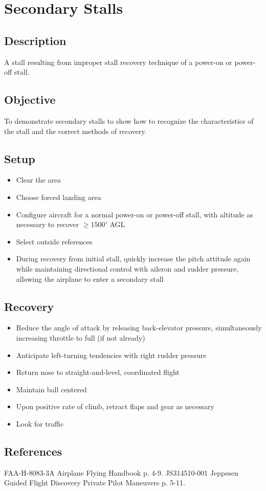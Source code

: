 \section{Secondary Stalls}

\subsection{Description}

A stall resulting from improper stall recovery technique of a power-on or
power-off stall.

\subsection{Objective}

To demonstrate secondary stalls to show how to recognize the characteristics of
the stall and the correct methods of recovery.

\subsection{Setup}

\begin{itemize}
  \item Clear the area
  \item Choose forced landing area
  \item Configure aircraft for a normal power-on or power-off stall, with
    altitude as necessary to recover $\geq 1500'$ AGL
  \item Select outside references
  \item During recovery from initial stall, quickly increase the pitch attitude
    again while maintaining directional control with aileron and rudder
    pressure, allowing the airplane to enter a secondary stall
\end{itemize}

\subsection{Recovery}

\begin{itemize}
  \item Reduce the angle of attack by releasing back-elevator pressure,
    simultaneously increasing throttle to full (if not already)
  \item Anticipate left-turning tendencies with right rudder pressure
  \item Return nose to straight-and-level, coordinated flight 
  \item Maintain ball centered
  \item Upon positive rate of climb, retract flaps and gear as necessary 
  \item Look for traffic
\end{itemize}

\subsection{References}

FAA-H-8083-3A Airplane Flying Handbook p. 4-9.
JS314510-001 Jeppesen Guided Flight Discovery Private Pilot Maneuvers p. 5-11.

